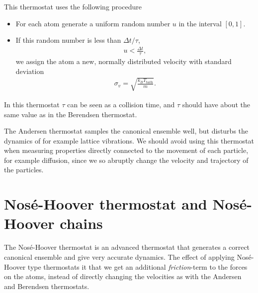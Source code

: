This thermostat uses the following procedure%
%
\begin{itemize}
    \item For each atom generate a uniform random number $u$ in the interval $[0,1]$.
    \item If this random number is less than $\Delta t/\tau$,
        \begin{align*}
            u < \frac{\Delta t}{\tau},
        \end{align*}
        we assign the atom a new, normally distributed velocity with standard deviation
        \begin{align*}
            \sigma_v = \sqrt{\frac{k_B T_\text{bath}}{m}}.
        \end{align*}
\end{itemize}
%
In this thermostat $\tau$ can be seen as a collision time, and $\tau$ should have about the same value as in the Berendsen thermostat.

The Andersen thermostat samples the canonical ensemble well, but disturbs the dynamics of for example lattice vibrations. We should avoid using this thermostat when measuring properties directly connected to the movement of each particle, for example diffusion, since we so abruptly change the velocity and trajectory of the particles.

\section{Nos\'e-Hoover thermostat and Nos\'e-Hoover chains}
The Nos\'e-Hoover thermostat is an advanced thermostat that generates a correct canonical ensemble and give very accurate dynamics\cite[section 6.1]{frenkel2001understanding}. The effect of applying Nosé-Hoover type thermostats it that we get an additional \emph{friction}-term to the forces on the atoms, instead of directly changing the velocities as with the Andersen and Berendsen thermostats.


